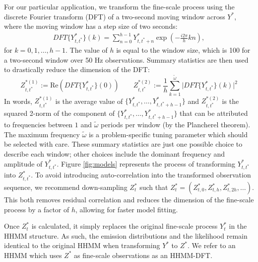 For our particular application, we transform the fine-scale process using the discrete Fourier transform (DFT) of a two-second moving window across $Y^*$, where the moving window has a step size of two seconds:
%
\begin{align*}
    DFT\{Y^*_{t,t^*}\}(k) = \sum_{n=0}^{h-1} Y^*_{t,t^*+n}\exp\left(-\frac{i 2\pi}{h} kn \right),
\end{align*}
%
for $k = 0, 1, \ldots, h-1$. The value of $h$ is equal to the window size, which is 100 for a two-second window over 50 Hz observations. Summary statistics are then used to drastically reduce the dimension of the DFT:
%
\begin{equation}
    \label{eqn:z}
    Z_{t,t^*}^{*(1)} := \text{Re}\left(DFT\{Y^*_{t,t^*}\}(0)\right) \qquad Z_{t,t^*}^{*(2)} := \frac{1}{h}\sum_{k=1}^{\tilde{\omega}}\bigg|DFT\{Y^*_{t,t^*}\}(k)\bigg|^2
\end{equation}
%
In words, $Z_{t,t^*}^{*(1)}$ is the average value of $\{Y^*_{t,t^*}, \ldots, Y^*_{t,t^*+h-1}\}$ and $Z_{t,t^*}^{*(2)}$ is the squared 2-norm of the component of $\{Y^*_{t,t^*}, \ldots, Y^*_{t,t^*+h-1}\}$ that can be attributed to frequencies between $1$ and $\tilde{\omega}$ periods per window (by the Plancherel theorem). The maximum frequency $\tilde{\omega}$ is a problem-specific tuning parameter which should be selected with care. These summary statistics are just one possible choice to describe each window; other choices include the dominant frequency and amplitude of $Y^*_{t,t^*}$. Figure \ref{fig:models} represents the process of transforming $Y^*_{t,t^*}$ into $Z^*_{t,t^*}$. To avoid introducing auto-correlation into the transformed observation sequence, we recommend down-sampling $Z^*_t$ such that $Z^*_t = \left(Z^*_{t,0},Z^*_{t,h},Z^*_{t,2h},\ldots\right)$. This both removes residual correlation and reduces the dimension of the fine-scale process by a factor of $h$, allowing for faster model fitting.

Once $Z^*_t$ is calculated, it simply replaces the original fine-scale process $Y^*_t$ in the HHMM structure. As such, the emission distributions and the likelihood remain identical to the original HHMM when transforming $Y^*$ to $Z^*$. We refer to an HHMM which uses $Z^*$ as fine-scale observations as an HHMM-DFT.


